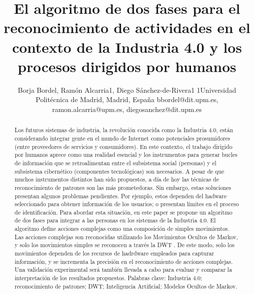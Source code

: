 \documentclass{article}
\title {\textbf{El algoritmo de dos fases para el reconocimiento de actividades en el contexto de la Industria 4.0 y los procesos dirigidos por humanos
}}
\author{ Borja Bordel, Ramón Alcarria1, Diego Sánchez-de-Rivera1 1Universidad Politécnica de Madrid, Madrid, España bbordel@dit.upm.es, ramon.alcarria@upm.es, diegosanchez@dit.upm.es}
\begin{document}
\maketitle
\begin{abstract}
	Los futuros sistemas de industria, la revolución conocida como la Industria 4.0, están considerando integrar gente en el mundo de Internet como potenciales prosumidores (entre proveedores de servicios y consumidores). En este contexto, el trabajo dirigido por humanos aprece como una realidad esencial y los instrumentos para generar bucles  de información que se retroalimentan entre el subsistema social (personas) y el subsistema cibernético (componentes tecnológicas) son necesarios. A pesar de que muchos instrumentos distintos han sido propuestos, a día de hoy las técnicas de reconocimiento de patrones son las más prometedoras. Sin embargo, estas soluciones presentan algunos problemas pendientes. Por ejemplo, estos dependen del hadware seleccionado para obtener información de los usuarios; o presentan límites en el proceso de identificación. Para abordar esta situación, en este paper se propone un algoritmo de dos fases para integrar a las personas en los sistemas de la Industria 4.0. El algoritmo define acciones complejas como una composición de simples movimientos. Las acciones complejas son reconocidas utilizando los Movimientos Ocultos de Markov, y solo los movimientos simples se reconocen a través la DWT . De este modo, solo los movimientos dependen de los recursos de hadrdware empleados para capturar información, y se incrementa  la precisión en el reconocimiento de acciones complejas. Una validación experimental será también llevada a cabo para evaluar y comparar la interpretación de los resultados propuestos.
	Palabras clave: Industria 4.0; reconocimiento de patrones; DWT; Inteligencia Artificial; Modelos Ocultos de Markov.
\end{abstract}
\end{document}
